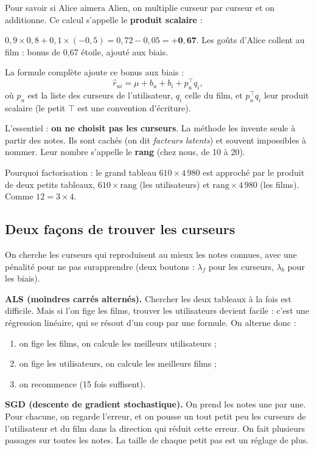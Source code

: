 \documentclass[11pt,a4paper]{article}
\newcommand{\rhat}{\hat r}
\begin{document}
Pour savoir si Alice aimera Alien, on multiplie curseur par curseur et on additionne.
Ce calcul s'appelle le \textbf{produit scalaire} :

\begin{exemple}
$0{,}9 \times 0{,}8 + 0{,}1 \times (-0{,}5) = 0{,}72 - 0{,}05 = \mathbf{+0{,}67}$.
Les goûts d'Alice collent au film : bonus de 0,67 étoile, ajouté aux biais.
\end{exemple}

La formule complète ajoute ce bonus aux biais :
\[
  \rhat_{ui} = \mu + b_u + b_i + p_u^\top q_i ,
\]
où $p_u$ est la liste des curseurs de l'utilisateur, $q_i$ celle du film, et
$p_u^\top q_i$ leur produit scalaire (le petit $\top$ est une convention d'écriture).

L'essentiel : \textbf{on ne choisit pas les curseurs}. La méthode les invente seule à
partir des notes. Ils sont cachés (on dit \emph{facteurs latents}) et souvent impossibles
à nommer. Leur nombre s'appelle le \textbf{rang} (chez nous, de 10 à 20).

Pourquoi \og factorisation \fg : le grand tableau $610 \times 4\,980$ est approché par
le produit de deux petits tableaux, $610 \times \text{rang}$ (les utilisateurs) et
$\text{rang} \times 4\,980$ (les films). Comme $12 = 3 \times 4$.

\subsection{Deux façons de trouver les curseurs}

On cherche les curseurs qui reproduisent au mieux les notes connues, avec une pénalité
pour ne pas surapprendre (deux boutons : $\lambda_f$ pour les curseurs, $\lambda_b$ pour
les biais).

\textbf{ALS (moindres carrés alternés).} Chercher les deux tableaux à la fois est
difficile. Mais si l'on fige les films, trouver les utilisateurs devient facile : c'est
une régression linéaire, qui se résout d'un coup par une formule. On alterne donc :
\begin{enumerate}
  \item on fige les films, on calcule les meilleurs utilisateurs ;
  \item on fige les utilisateurs, on calcule les meilleurs films ;
  \item on recommence (15 fois suffisent).
\end{enumerate}

\textbf{SGD (descente de gradient stochastique).} On prend les notes une par une. Pour
chacune, on regarde l'erreur, et on pousse un tout petit peu les curseurs de l'utilisateur
et du film dans la direction qui réduit cette erreur. On fait plusieurs passages sur toutes
les notes. La taille de chaque petit pas est un réglage de plus.
\end{document}

